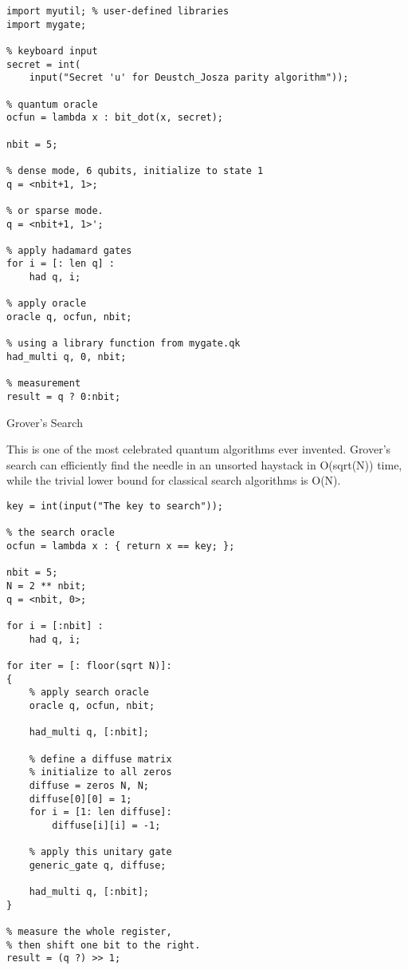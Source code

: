 \documentclass[]{article}
\begin{document}
\begin{verbatim}
import myutil; % user-defined libraries
import mygate;

% keyboard input
secret = int(
    input("Secret 'u' for Deustch_Josza parity algorithm"));

% quantum oracle
ocfun = lambda x : bit_dot(x, secret);

nbit = 5;

% dense mode, 6 qubits, initialize to state 1
q = <nbit+1, 1>;

% or sparse mode. 
q = <nbit+1, 1>';

% apply hadamard gates
for i = [: len q] :
    had q, i;

% apply oracle
oracle q, ocfun, nbit;

% using a library function from mygate.qk
had_multi q, 0, nbit;

% measurement
result = q ? 0:nbit; 
\end{verbatim}

Grover's Search

This is one of the most celebrated quantum algorithms ever invented.
Grover's search can efficiently find the needle in an unsorted haystack
in O(sqrt(N)) time, while the trivial lower bound for classical search
algorithms is O(N).

\begin{verbatim}
key = int(input("The key to search"));

% the search oracle
ocfun = lambda x : { return x == key; };

nbit = 5;
N = 2 ** nbit;
q = <nbit, 0>;

for i = [:nbit] :
    had q, i;

for iter = [: floor(sqrt N)]:
{
    % apply search oracle
    oracle q, ocfun, nbit;

    had_multi q, [:nbit];

    % define a diffuse matrix
    % initialize to all zeros
    diffuse = zeros N, N;
    diffuse[0][0] = 1;
    for i = [1: len diffuse]:
        diffuse[i][i] = -1;

    % apply this unitary gate
    generic_gate q, diffuse;

    had_multi q, [:nbit];
}

% measure the whole register, 
% then shift one bit to the right.
result = (q ?) >> 1;
\end{verbatim}
\end{document}
